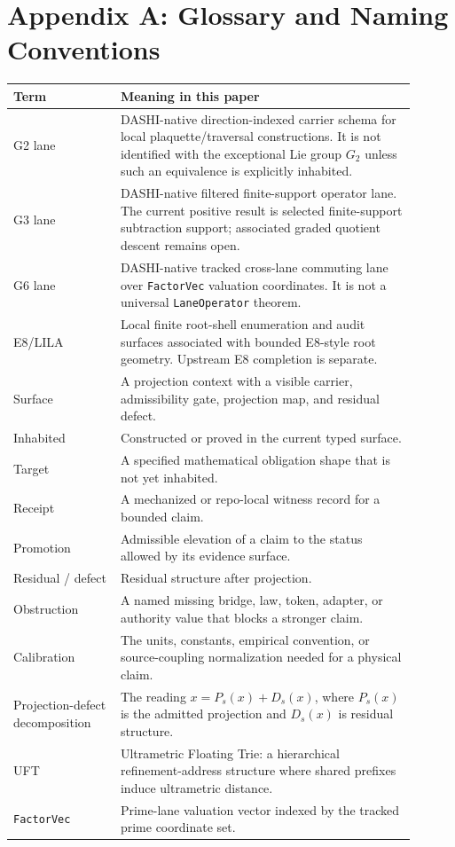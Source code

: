\documentclass[11pt]{article}
\theoremstyle{definition}
\theoremstyle{plain}
\theoremstyle{remark}
\begin{document}
\section*{Appendix A: Glossary and Naming Conventions}
\renewcommand{\arraystretch}{1.12}
\begin{longtable}{p{0.24\linewidth}p{0.66\linewidth}}
\toprule
Term & Meaning in this paper \\
\midrule
G2 lane & DASHI-native direction-indexed carrier schema for local
plaquette/traversal constructions. It is not identified with the exceptional
Lie group \(G_2\) unless such an equivalence is explicitly inhabited. \\
G3 lane & DASHI-native filtered finite-support operator lane. The current
positive result is selected finite-support subtraction support; associated
graded quotient descent remains open. \\
G6 lane & DASHI-native tracked cross-lane commuting lane over
\texttt{FactorVec} valuation coordinates. It is not a universal
\texttt{LaneOperator} theorem. \\
E8/LILA & Local finite root-shell enumeration and audit surfaces associated
with bounded E8-style root geometry. Upstream E8 completion is separate. \\
Surface & A projection context with a visible carrier, admissibility gate,
projection map, and residual defect. \\
Inhabited & Constructed or proved in the current typed surface. \\
Target & A specified mathematical obligation shape that is not yet inhabited. \\
Receipt & A mechanized or repo-local witness record for a bounded claim. \\
Promotion & Admissible elevation of a claim to the status allowed by its
evidence surface. \\
Residual / defect & Residual structure after projection. \\
Obstruction & A named missing bridge, law, token, adapter, or authority value
that blocks a stronger claim. \\
Calibration & The units, constants, empirical convention, or source-coupling
normalization needed for a physical claim. \\
Projection-defect decomposition & The reading \(x=P_s(x)+D_s(x)\), where
\(P_s(x)\) is the admitted projection and \(D_s(x)\) is residual structure. \\
UFT & Ultrametric Floating Trie: a hierarchical refinement-address structure
where shared prefixes induce ultrametric distance. \\
\texttt{FactorVec} & Prime-lane valuation vector indexed by the tracked prime
coordinate set. \\
\bottomrule
\end{longtable}
\renewcommand{\arraystretch}{1.0}
\end{document}

